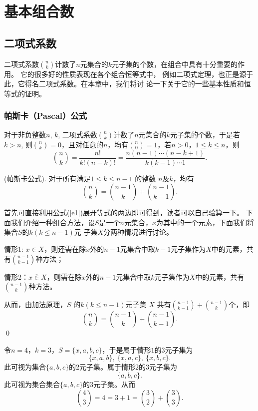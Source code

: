 \chapter{基本组合数}
\label{zuhejiegou} \minitoc



\section{二项式系数}

二项式系数${n \choose
k}$计数了$n$元集合的$k$元子集的个数，在组合中具有十分重要的作用。
它的很多好的性质表现在各个组合恒等式中，
例如二项式定理，也正是源于此，它得名二项式系数。在本章中，我们将讨
论一下关于它的一些基本性质和恒等式的证明。

\subsection{帕斯卡（Pascal）公式}
对于非负整数$n$, $k$, 二项式系数${n \choose
k}$计数了$n$元集合的$k$元子集的个数，于是若 $k>n$, 则${n \choose
k}=0$，且对任意的$n$，均有${n \choose 0}=1$，若$n>0$，$1\leq k \leq
n$，则
\begin{equation}\label{e1}
{n \choose k}=\frac{n!}{k!(n-k)!}=\frac{n(n-1)\cdots
(n-k+1)}{k(k-1)\cdots 1}.
\end{equation}
\begin{thm}
(帕斯卡公式). 对于所有满足$1\leq k\leq n-1$ 的整数 $n$及$k$，均有
\begin{equation}\label{e2}
{n\choose k}={n-1 \choose k}+{n-1\choose k-1}.
\end{equation}
\end{thm}
首先可直接利用公式(\ref{e1})展开等式的两边即可得到，读者可以自己验算一下。
下面我们介绍一种组合方法，设$S$是一个$n$元集合，$x$为其中的一个元素，下面我们将集合$S$的$k(k\leq
n-1)$元 子集$X$分两种情况进行讨论。

情形1: $x\in
X$，则还需在除$x$外的$n-1$元集合中取$k-1$元子集作为$X$中的元素，共有${n-1
\choose k-1}$种方法；

情形2：$x\overline{\in}
X$，则需在除$x$外的$n-1$元集合中取$k$元子集作为$X$中的元素，共有${n-1
\choose k}$种方法。

从而，由加法原理，$S$ 的$k(k\leq n-1)$元子集 $X$ 共有${n-1 \choose
k-1}+{n-1 \choose k}$个，即
$${n\choose k}={n-1 \choose k}+{n-1\choose k-1}.$$
\qed
\begin{exa}
令$n=4$，$k=3$，$S=\{x,a,b,c\}$，于是属于情形$1$的$3$元子集为$$\{x,a,b\},\
\{x,a,c\},\
\{x,b,c\}.$$此可视为集合$\{a,b,c\}$的$2$元子集。属于情形$2$的$3$元子集为$$\{a,b,c\}.$$
此可视为集合集合$\{a,b,c\}$的$3$元子集。从而$${4 \choose
3}=4=3+1={3\choose 2}+{3\choose 3}.$$
\end{exa}

